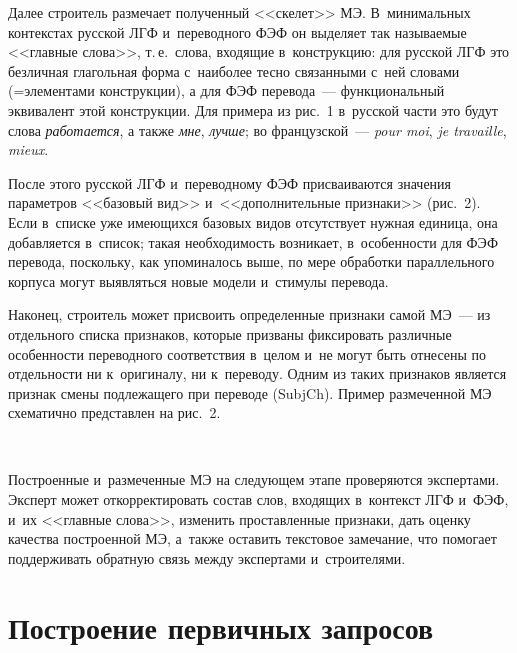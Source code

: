 \begin{multicols}{2}
  Далее строитель размечает полученный <<скелет>> МЭ. В~минимальных 
контекстах русской ЛГФ и~переводного ФЭФ он выделяет так называемые 
<<главные слова>>, т.\,е.\ слова, входящие в~конструкцию: для русской ЛГФ 
это безличная глагольная форма с~наиболее тесно связанными с~ней словами 
(=\;эле\-мен\-та\-ми конструкции), а для ФЭФ перевода~--- функциональный 
эквивалент этой конструкции. Для примера из рис.~1 в~русской части это будут 
слова \textit{работается}, а также \textit{мне}, \textit{лучше}; во  
французской~--- \textit{pour moi}, \textit{je travaille}, \textit{mieux}.
  
  После этого русской ЛГФ и~переводному ФЭФ присваиваются значения 
параметров <<базовый вид>> и~<<дополнительные признаки>> (рис.~2). 
Если в~списке уже имеющихся базовых видов отсутствует нужная единица, она 
добавляется в~список; такая необходимость возникает, в~особенности для ФЭФ 
перевода, поскольку, как упоминалось выше, по мере обработки параллельного 
корпуса могут выявляться новые модели и~стимулы перевода. 
  
  Наконец, строитель может присвоить определенные признаки самой МЭ~--- 
из отдельного списка признаков, которые призваны фиксировать различные 
особенности переводного соответствия в~целом и~не могут быть отнесены по 
отдельности ни к~оригиналу, ни к~переводу. Одним из таких признаков является 
признак смены подлежащего при переводе (SubjCh). Пример размеченной МЭ 
схематично представлен на рис.~2.

\begin{figure*} %
\vspace*{1pt}
\begin{center}
\mbox{%
\epsfxsize=128.783mm
}
\end{center}
\vspace*{-9pt}
\vspace*{12pt}
\end{figure*}

  Построенные и~размеченные МЭ на следующем этапе проверяются 
экспертами. Эксперт может откорректировать состав слов, входящих в~контекст 
ЛГФ и~ФЭФ, и~их <<главные слова>>, изменить проставленные признаки, дать 
оценку качества построенной МЭ, а~также оставить текстовое замечание, что 
помогает поддерживать обратную связь между экспертами и~строителями.
  
\section{Построение первичных запросов}


\end{multicols}
